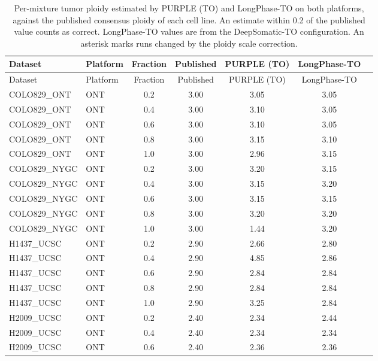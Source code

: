 \documentclass[pdflatex,sn-nature]{sn-jnl}
\begin{document}
\begin{small}
\begin{longtable}{@{}llccccc@{}}
  \caption[Tumor ploidy estimates]%
  {Per-mixture tumor ploidy estimated by PURPLE (TO) and LongPhase-TO on both platforms, against the published consensus ploidy of each cell line. An estimate within 0.2 of the published value counts as correct. LongPhase-TO values are from the DeepSomatic-TO configuration. An asterisk marks runs changed by the ploidy scale correction.}
  \label{tab:ploidy-accuracy}\\
  \toprule
  Dataset & Platform & Fraction & Published & PURPLE (TO) & LongPhase-TO \\
  \midrule
  \endfirsthead
  \toprule
  Dataset & Platform & Fraction & Published & PURPLE (TO) & LongPhase-TO \\
  \midrule
  \endhead
  \bottomrule
  \endlastfoot
  COLO829\_ONT & ONT & 0.2 & 3.00 & 3.05 & 3.05 \\
  COLO829\_ONT & ONT & 0.4 & 3.00 & 3.10 & 3.05 \\
  COLO829\_ONT & ONT & 0.6 & 3.00 & 3.10 & 3.05 \\
  COLO829\_ONT & ONT & 0.8 & 3.00 & 3.15 & 3.10 \\
  COLO829\_ONT & ONT & 1.0 & 3.00 & 2.96 & 3.15 \\
  \addlinespace
  COLO829\_NYGC & ONT & 0.2 & 3.00 & 3.20 & 3.15 \\
  COLO829\_NYGC & ONT & 0.4 & 3.00 & 3.15 & 3.20 \\
  COLO829\_NYGC & ONT & 0.6 & 3.00 & 3.15 & 3.15 \\
  COLO829\_NYGC & ONT & 0.8 & 3.00 & 3.20 & 3.20 \\
  COLO829\_NYGC & ONT & 1.0 & 3.00 & 1.44 & 3.20 \\
  \addlinespace
  H1437\_UCSC & ONT & 0.2 & 2.90 & 2.66 & 2.80 \\
  H1437\_UCSC & ONT & 0.4 & 2.90 & 4.85 & 2.86 \\
  H1437\_UCSC & ONT & 0.6 & 2.90 & 2.84 & 2.84 \\
  H1437\_UCSC & ONT & 0.8 & 2.90 & 2.84 & 2.84 \\
  H1437\_UCSC & ONT & 1.0 & 2.90 & 3.25 & 2.84 \\
  \addlinespace
  H2009\_UCSC & ONT & 0.2 & 2.40 & 2.34 & 2.44 \\
  H2009\_UCSC & ONT & 0.4 & 2.40 & 2.34 & 2.34 \\
  H2009\_UCSC & ONT & 0.6 & 2.40 & 2.36 & 2.36 \\

\end{longtable}
\end{small}
\end{document}

